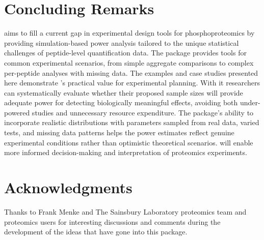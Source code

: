 \documentclass[article]{jss}
\begin{document}
\section{Concluding Remarks}

 aims to fill a current gap in experimental design tools for phosphoproteomics by providing simulation-based power analysis tailored to the unique statistical challenges of peptide-level quantification data. The package provides tools for common experimental scenarios, from simple aggregate comparisons to complex per-peptide analyses with missing data.
                                                                                                                                                   The examples and case studies presented here demonstrate 's practical value for experimental planning. With it researchers can systematically evaluate whether their proposed sample sizes will provide adequate power for detecting biologically meaningful effects, avoiding both under-powered studies and unnecessary resource expenditure. The package's ability to incorporate realistic distributions with parameters sampled from real data, varied tests, and missing data patterns helps the power estimates reflect genuine experimental conditions rather than optimistic theoretical scenarios.  will enable more informed decision-making and interpretation of proteomics experiments.

\section*{Acknowledgments}

\begin{leftbar}
Thanks to Frank Menke and The Sainsbury Laboratory proteomics team and proteomics users for interesting discussions and comments during the development of the ideas that have gone into this package.
\end{leftbar}



\end{document}
